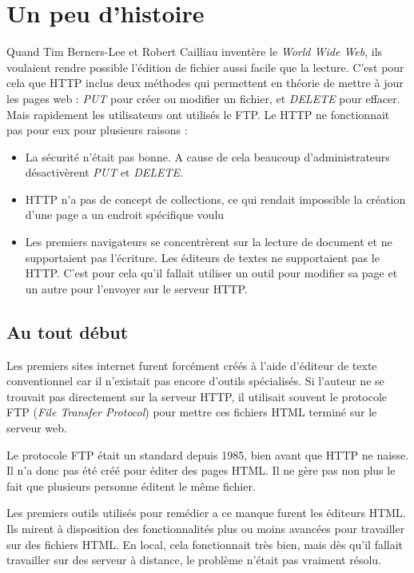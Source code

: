 \documentclass[a4paper, 11pt]{article}
\begin{document}
\section{Un peu d'histoire}

	
	Quand Tim Berners-Lee et Robert Cailliau inventère le \emph{World Wide Web}, ils voulaient rendre possible l'édition de fichier aussi facile que la lecture. C'est pour cela que HTTP inclus deux méthodes qui permettent en théorie de mettre à jour les pages web : \emph{PUT} pour créer ou modifier un fichier, et \emph{DELETE} pour effacer. Mais rapidement les utilisateurs ont utilisés le FTP. Le HTTP ne fonctionnait pas pour eux pour plusieurs raisons : 

	\begin{itemize}
		\item 	La sécurité n'était pas bonne. A cause de cela beaucoup d'administrateurs désactivèrent \emph{PUT} et \emph{DELETE}.
		\item 	HTTP n'a pas de concept de collections, ce qui rendait impossible la création d'une page a un endroit spécifique voulu
		\item 	Les premiers navigateurs se concentrèrent sur la lecture de document et ne supportaient pas l'écriture. Les éditeurs de textes ne supportaient pas le HTTP. C'est pour cela qu'il fallait utiliser un outil pour modifier sa page et un autre pour l'envoyer sur le serveur HTTP.
	\end{itemize}
			
	\subsection{Au tout début}
	
		Les premiers sites internet furent forcément créés à l'aide d'éditeur de texte conventionnel car il n'existait pas encore d'outils spécialisés. Si l'auteur ne se trouvait pas directement sur la serveur HTTP, il utilisait souvent le protocole FTP (\emph{File Transfer Protocol}) pour mettre ces fichiers HTML terminé sur le serveur web. 

		Le protocole FTP était un standard depuis 1985, bien avant que HTTP ne naisse. Il n'a donc pas été créé pour éditer des pages HTML. Il ne gère pas non plus le fait que plusieurs personne éditent le même fichier. 

		Les premiers outils utilisés pour remédier a ce manque furent les éditeurs HTML. Ils mirent à disposition des fonctionnalités plus ou moins avancées pour travailler sur des fichiers HTML. En local, cela fonctionnait très bien, mais dès qu'il fallait travailler sur des serveur à distance, le problème n'était pas vraiment résolu.
\end{document}
